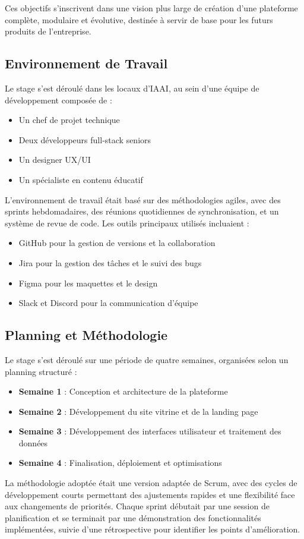 Ces objectifs s'inscrivent dans une vision plus large de création d'une plateforme complète, modulaire et évolutive, destinée à servir de base pour les futurs produits de l'entreprise.

\subsection{Environnement de Travail}
Le stage s'est déroulé dans les locaux d'IAAI, au sein d'une équipe de développement composée de :

\begin{itemize}
  \item Un chef de projet technique
  \item Deux développeurs full-stack seniors
  \item Un designer UX/UI
  \item Un spécialiste en contenu éducatif
\end{itemize}

L'environnement de travail était basé sur des méthodologies agiles, avec des sprints hebdomadaires, des réunions quotidiennes de synchronisation, et un système de revue de code. Les outils principaux utilisés incluaient :

\begin{itemize}
  \item GitHub pour la gestion de versions et la collaboration
  \item Jira pour la gestion des tâches et le suivi des bugs
  \item Figma pour les maquettes et le design
  \item Slack et Discord pour la communication d'équipe
\end{itemize}

\subsection{Planning et Méthodologie}
Le stage s'est déroulé sur une période de quatre semaines, organisées selon un planning structuré :

\begin{itemize}
  \item \textbf{Semaine 1} : Conception et architecture de la plateforme
  \item \textbf{Semaine 2} : Développement du site vitrine et de la landing page
  \item \textbf{Semaine 3} : Développement des interfaces utilisateur et traitement des données
  \item \textbf{Semaine 4} : Finalisation, déploiement et optimisations
\end{itemize}

La méthodologie adoptée était une version adaptée de Scrum, avec des cycles de développement courts permettant des ajustements rapides et une flexibilité face aux changements de priorités. Chaque sprint débutait par une session de planification et se terminait par une démonstration des fonctionnalités implémentées, suivie d'une rétrospective pour identifier les points d'amélioration. 
